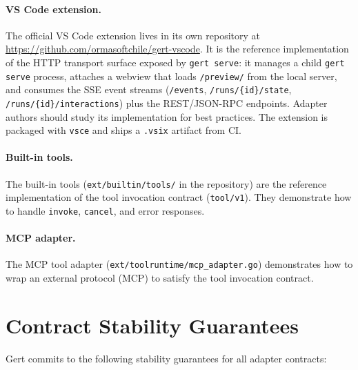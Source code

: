 \paragraph{VS Code extension.}

The official VS Code extension lives in its own repository at
\url{https://github.com/ormasoftchile/gert-vscode}. It is the reference implementation of
the HTTP transport surface exposed by \texttt{gert serve}: it manages a child
\texttt{gert serve} process, attaches a webview that loads
\texttt{/preview/} from the local server, and consumes the SSE event streams
(\texttt{/events}, \texttt{/runs/\{id\}/state}, \texttt{/runs/\{id\}/interactions}) plus
the REST/JSON-RPC endpoints. Adapter authors should study its implementation for best
practices. The extension is packaged with \texttt{vsce} and ships a \texttt{.vsix}
artifact from CI.

\paragraph{Built-in tools.}

The built-in tools (\texttt{ext/builtin/tools/} in the repository) are the
reference implementation of the tool invocation contract (\texttt{tool/v1}).
They demonstrate how to handle \texttt{invoke}, \texttt{cancel}, and error
responses.

\paragraph{MCP adapter.}

The MCP tool adapter (\texttt{ext/toolruntime/mcp\_adapter.go}) demonstrates
how to wrap an external protocol (MCP) to satisfy the tool invocation contract.

\section{Contract Stability Guarantees}

Gert commits to the following stability guarantees for all adapter
contracts:

